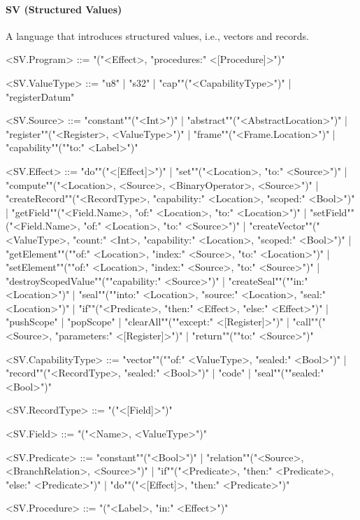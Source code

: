 \documentclass[main.tex]{subfiles}
\begin{document}
\paragraph{ SV (Structured Values) } A language that introduces structured values, i.e., vectors and records.
\begin{grammar}
	\footnotesize
				<SV.Program> ::=
							"("<Effect>, "procedures:" <[Procedure]>")"
				\par
				<SV.ValueType> ::=
						"u8"
						| "s32"
						| "cap""("<CapabilityType>")"
						| "registerDatum"
				\par
				<SV.Source> ::=
						"constant""("<Int>")"
						| "abstract""("<AbstractLocation>")"
						| "register""("<Register>, <ValueType>")"
						| "frame""("<Frame.Location>")"
						| "capability""(""to:" <Label>")"
				\par
				<SV.Effect> ::=
						"do""("<[Effect]>")"
						| "set""("<Location>, "to:" <Source>")"
						| "compute""("<Location>, <Source>, <BinaryOperator>, <Source>")"
						| "createRecord""("<RecordType>, "capability:" <Location>, "scoped:" <Bool>")"
						| "getField""("<Field.Name>, "of:" <Location>, "to:" <Location>")"
						| "setField""("<Field.Name>, "of:" <Location>, "to:" <Source>")"
						| "createVector""("<ValueType>, "count:" <Int>, "capability:" <Location>, "scoped:" <Bool>")"
						| "getElement""(""of:" <Location>, "index:" <Source>, "to:" <Location>")"
						| "setElement""(""of:" <Location>, "index:" <Source>, "to:" <Source>")"
						| "destroyScopedValue""(""capability:" <Source>")"
						| "createSeal""(""in:" <Location>")"
						| "seal""(""into:" <Location>, "source:" <Location>, "seal:" <Location>")"
						| "if""("<Predicate>, "then:" <Effect>, "else:" <Effect>")"
						| "pushScope"
						| "popScope"
						| "clearAll""(""except:" <[Register]>")"
						| "call""("<Source>, "parameters:" <[Register]>")"
						| "return""(""to:" <Source>")"
				\par
				<SV.CapabilityType> ::=
						"vector""(""of:" <ValueType>, "sealed:" <Bool>")"
						| "record""("<RecordType>, "sealed:" <Bool>")"
						| "code"
						| "seal""(""sealed:" <Bool>")"
				\par
				<SV.RecordType> ::=
							"("<[Field]>")"
				\par
				<SV.Field> ::=
							"("<Name>, <ValueType>")"
				\par
				<SV.Predicate> ::=
						"constant""("<Bool>")"
						| "relation""("<Source>, <BranchRelation>, <Source>")"
						| "if""("<Predicate>, "then:" <Predicate>, "else:" <Predicate>")"
						| "do""("<[Effect]>, "then:" <Predicate>")"
				\par
				<SV.Procedure> ::=
							"("<Label>, "in:" <Effect>")"
				\par
\end{grammar}
\par
\end{document}
